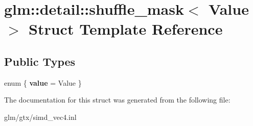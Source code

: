 \hypertarget{structglm_1_1detail_1_1shuffle__mask}{\section{glm\-:\-:detail\-:\-:shuffle\-\_\-mask$<$ Value $>$ Struct Template Reference}
\label{structglm_1_1detail_1_1shuffle__mask}
}
\subsection*{Public Types}
\begin{DoxyCompactItemize}
\item 
enum \{ {\bfseries value} = Value
 \}
\end{DoxyCompactItemize}


The documentation for this struct was generated from the following file\-:\begin{DoxyCompactItemize}
\item 
glm/gtx/simd\-\_\-vec4.\-inl\end{DoxyCompactItemize}
